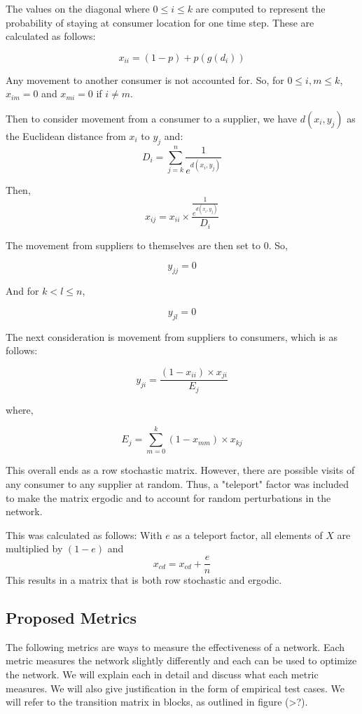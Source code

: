 \documentclass[twoside,twocolumn]{article}
\begin{document}
The values on the diagonal where $0 \leq i \leq k$ are computed to represent the probability of staying at consumer location for one time step.
These are calculated as follows:

$$x_{ii} = (1-p) + p(g(d_{i}))$$

Any movement to another consumer is not accounted for. %
So, for $0 \leq i,m \leq k$, $x_{im} = 0$ and $x_{mi} = 0$ if $i \neq m$.

Then to consider movement from a consumer to a supplier, we have $d(x_i, y_j)$ as the Euclidean distance from $x_i$ to $y_j$ and:
$$D_i = \sum_{j=k}^{n} \frac{1}{e^{d(x_i,y_j)}}$$

Then,
$$x_{ij} = x_{ii} \times \frac{\frac{1}{e^{d(x_i,y_j)}}}{D_i}$$

The movement from suppliers to themselves are then set to 0.
So,

$$y_{jj} = 0$$

And for $k < l \leq n$,

$$y_{jl} = 0$$ %

The next consideration is movement from suppliers to consumers, which is as follows:

$$y_{ji} = \frac{(1-x_{ii})\times x_{ji}}{E_j}$$

where, 

$$E_j = \sum_{m=0}^{k} (1-x_{mm})\times x_{kj}$$

This overall ends as a row stochastic matrix.
However, there are possible visits of any consumer to any supplier at random.
Thus, a "teleport" factor was included to make the matrix ergodic and to account for random perturbations in the network.

This was calculated as follows:
With $e$ as a teleport factor, all elements of $X$ are multiplied by $(1-e)$ and 
$$x_{cd} = x_{cd} + \frac{e}{n}$$
This results in a matrix that is both row stochastic and ergodic.








\subsection{Proposed Metrics}
The following metrics are ways to measure the effectiveness of a network.
Each metric measures the network slightly differently and each can be used to optimize the network.
We will explain each in detail and discuss what each metric measures.
We will also give justification in the form of empirical test cases.
We will refer to the transition matrix in blocks, as outlined in figure (>?).
\end{document}
